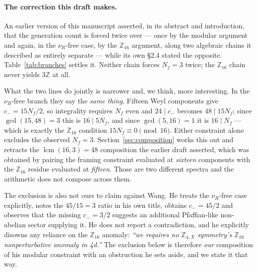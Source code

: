 \documentclass[aps,prd,reprint,nofootinbib,superscriptaddress]{revtex4-2}
\begin{document}
\paragraph{The correction this draft makes.}
An earlier version of this manuscript asserted, in its abstract and
introduction, that the generation count is forced twice over --- once by
the modular argument and again, in the $\nu_R$-free case, by the
$\mathbb{Z}_{16}$ argument, along two algebraic chains it described as
entirely separate --- while its own \S2.4 stated the opposite.
Table~\ref{tab:branches} settles it. Neither chain forces $N_f = 3$
twice; the $\mathbb{Z}_{16}$ chain never yields $3\mathbb{Z}$ at all.

\begin{table}[t]
\caption{The two constraints, by branch. The $\mathbb{Z}_{16}$ condition
constrains content per generation; only in the $\nu_R$-free branch does it
bite on the count, and there the framing constraint gives the same
condition rather than an independent one.}
\label{tab:branches}
\begin{ruledtabular}

\end{ruledtabular}
\end{table}

What the two lines do jointly is narrower and, we think, more
interesting. In the $\nu_R$-free branch they say the \emph{same thing}.
Fifteen Weyl components give $c_{-} = 15 N_f / 2$, so integrality
requires $N_f$ even and $24 \mid c_{-}$ becomes $48 \mid 15 N_f$;
since $\gcd(15,48) = 3$ this is $16 \mid 5 N_f$, and since $\gcd(5,16)=1$
it is $16 \mid N_f$ --- which is exactly the $\mathbb{Z}_{16}$ condition
$15 N_f \equiv 0 \pmod{16}$. Either constraint alone excludes the
observed $N_f = 3$. Section~\ref{sec:composition} works this out and
retracts the $\operatorname{lcm}(16,3) = 48$ composition the earlier draft
asserted, which was obtained by pairing the framing constraint evaluated
at \emph{sixteen} components with the $\mathbb{Z}_{16}$ residue evaluated
at \emph{fifteen}. Those are two different spectra and the arithmetic
does not compose across them.

The exclusion is also not ours to claim against Wang. He treats the
$\nu_R$-free case explicitly, notes the $45/15 = 3$ ratio in his own
title, obtains $c_{-} = 45/2$ and observes that the missing $c_{-} = 3/2$
suggests an additional Pfaffian-like non-abelian sector supplying it. He
does not report a contradiction, and he explicitly disowns any reliance
on the $\mathbb{Z}_{16}$ anomaly: \emph{``we requires no
$\mathbb{Z}_{4,X}$ symmetry's $\mathbb{Z}_{16}$ nonperturbative anomaly
in 4d.''} The exclusion below is therefore \emph{our} composition of
his modular constraint with an obstruction he sets aside, and we state it
that way.
\end{document}
